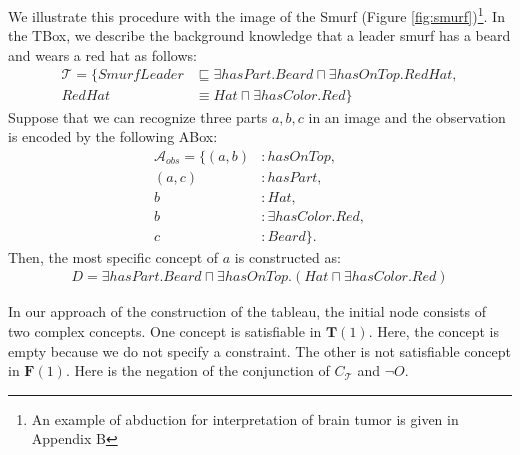 \documentclass{article}
\begin{document}
We illustrate this procedure with the image of the Smurf (Figure \ref{fig:smurf})\footnote{An example of abduction for interpretation of brain tumor is given in Appendix B}.
In the TBox, we describe the background knowledge that a leader smurf has a beard and wears a red hat as follows:
\begin{align*}
\mathcal{T}=\{SmurfLeader &\sqsubseteq \exists hasPart.Beard \sqcap \exists hasOnTop.RedHat, \\
RedHat &\equiv Hat \sqcap \exists hasColor.Red \} 
\end{align*}
Suppose that we can recognize three parts $a,b,c$ in an image and the observation is encoded by the following ABox:
\begin{align*}
\mathcal{A}_{obs} =\{(a,b)&: hasOnTop, \\
 (a,c)&: hasPart,\\
 b&:Hat,\\
 b&:\exists hasColor.Red,\\
 c&:Beard\}.
\end{align*}
Then, the most specific concept of $a$ is constructed as:
\begin{align*}
D=\exists hasPart.Beard \sqcap \exists hasOnTop.(Hat \sqcap  \exists hasColor.Red) 
\end{align*}

In our approach of the construction of the tableau, the initial node consists of two complex concepts.
One concept is satisfiable in $\mathbf{T}(1)$. Here, the concept is empty because we do not specify  a constraint.
The other is not satisfiable concept in $ \mathbf{F} (1) $. Here is the negation of the conjunction of $ C_\mathcal{T}$ and $ \neg O$. 
\end{document}
